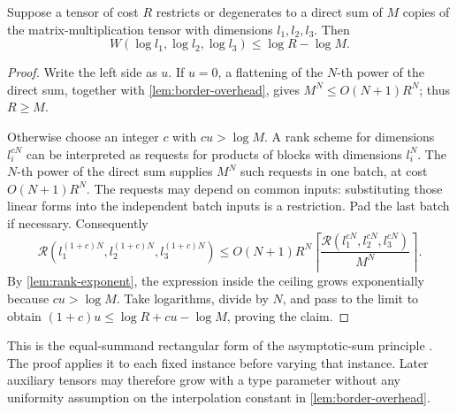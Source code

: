 \begin{lemma}\label{lem:rectangular-sum}
Suppose a tensor of cost \(R\) restricts or degenerates to a direct sum
of \(M\) copies of the matrix-multiplication tensor with dimensions
\(l_1,l_2,l_3\).  Then
\begin{equation}\label{eq:rectangular-sum}
 W(\log l_1,\log l_2,\log l_3)\le \log R-\log M.
\end{equation}
\end{lemma}

\begin{proof}
Write the left side as \(u\).
If \(u=0\), a flattening of the \(N\)-th power of the direct sum,
together with \cref{lem:border-overhead}, gives
\(M^N\le O(N+1)R^N\); thus \(R\ge M\).

Otherwise choose an integer \(c\) with \(cu>\log M\).
A rank scheme for dimensions \(l_i^{cN}\) can be interpreted as requests
for products of blocks with dimensions \(l_i^N\).
The \(N\)-th power of the direct sum supplies \(M^N\) such requests in
one batch, at cost \(O(N+1)R^N\).
The requests may depend on common inputs: substituting those linear
forms into the independent batch inputs is a restriction.
Pad the last batch if necessary.  Consequently
\[
 \mathcal R(l_1^{(1+c)N},l_2^{(1+c)N},l_3^{(1+c)N})
 \le O(N+1)R^N
 \left\lceil
 \frac{\mathcal R(l_1^{cN},l_2^{cN},l_3^{cN})}{M^N}
 \right\rceil .
\]
By \cref{lem:rank-exponent}, the expression inside the ceiling grows
exponentially because \(cu>\log M\).
Take logarithms, divide by \(N\), and pass to the limit to obtain
\((1+c)u\le \log R+cu-\log M\), proving the claim.
\end{proof}

This is the equal-summand rectangular form of the asymptotic-sum
principle \cite{schonhage}.
The proof applies it to each fixed instance before varying that
instance.  Later auxiliary tensors may therefore grow with a type
parameter without any uniformity assumption on the interpolation
constant in \cref{lem:border-overhead}.
